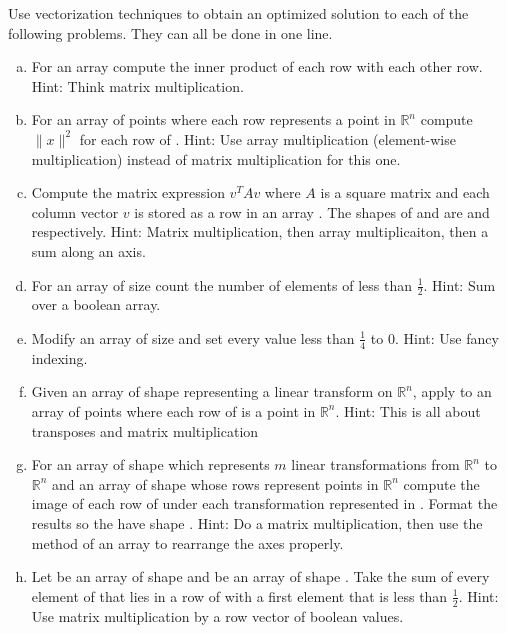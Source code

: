 \begin{problem}
Use vectorization techniques to obtain an optimized solution to each of the following problems.
They can all be done in one line.

\begin{enumerate}[a)]

\item For an array  compute the inner product of each row with each other row.
Hint: Think matrix multiplication.

\item For an array of points  where each row represents a point in $\mathbb{R}^n$ compute $\| x\|^2$ for each row  of .
Hint: Use array multiplication (element-wise multiplication) instead of matrix multiplication for this one.

\item Compute the matrix expression $v^T A v$ where $A$ is a square matrix and each column vector $v$ is stored as a row in an array .
The shapes of  and  are  and  respectively.
Hint: Matrix multiplication, then array multiplicaiton, then a sum along an axis.

\item For an array  of size  count the number of elements of  less than $\frac{1}{2}$.
Hint: Sum over a boolean array.

\item Modify an array  of size  and set every value less than $\frac{1}{4}$ to $0$.
Hint: Use fancy indexing.

\item Given an array  of shape  representing a linear transform on $\mathbb{R}^n$, apply  to an array of points  where each row of  is a point in $\mathbb{R}^n$.
Hint: This is all about transposes and matrix multiplication

\item For an array  of shape  which represents $m$ linear transformations from $\mathbb{R}^n$ to $\mathbb{R}^n$ and an array  of shape  whose rows represent points in $\mathbb{R}^n$ compute the image of each row of  under each transformation represented in .
Format the results so the have shape .
Hint: Do a matrix multiplication, then use the  method of an array to rearrange the axes properly.

\item Let  be an array of shape  and  be an array of shape .
Take the sum of every element of  that lies in a row of  with a first element that is less than $\frac{1}{2}$.
Hint: Use matrix multiplication by a row vector of boolean values.


\end{enumerate}
\end{problem}
